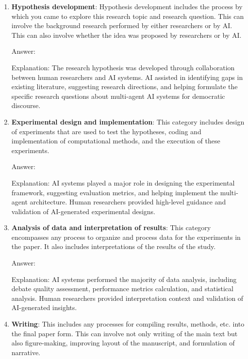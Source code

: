 \documentclass{article}
\begin{document}
\begin{enumerate}
    \item \textbf{Hypothesis development}: Hypothesis development includes the process by which you came to explore this research topic and research question. This can involve the background research performed by either researchers or by AI. This can also involve whether the idea was proposed by researchers or by AI. 

    Answer: \involvementC{} 
    
    Explanation: The research hypothesis was developed through collaboration between human researchers and AI systems. AI assisted in identifying gaps in existing literature, suggesting research directions, and helping formulate the specific research questions about multi-agent AI systems for democratic discourse.
    
    \item \textbf{Experimental design and implementation}: This category includes design of experiments that are used to test the hypotheses, coding and implementation of computational methods, and the execution of these experiments. 

    Answer: \involvementC{} 
    
    Explanation: AI systems played a major role in designing the experimental framework, suggesting evaluation metrics, and helping implement the multi-agent architecture. Human researchers provided high-level guidance and validation of AI-generated experimental designs.
    
    \item \textbf{Analysis of data and interpretation of results}: This category encompasses any process to organize and process data for the experiments in the paper. It also includes interpretations of the results of the study.
 

    Answer: \involvementC{} 
    
    Explanation: AI systems performed the majority of data analysis, including debate quality assessment, performance metrics calculation, and statistical analysis. Human researchers provided interpretation context and validation of AI-generated insights.
    
    \item \textbf{Writing}: This includes any processes for compiling results, methods, etc. into the final paper form. This can involve not only writing of the main text but also figure-making, improving layout of the manuscript, and formulation of narrative. 


\end{enumerate}
\end{document}
